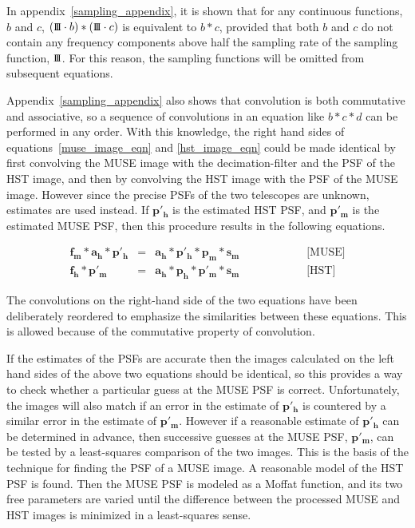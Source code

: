 \documentclass[12pt,twoside,a4paper]{article}
\newcommand{\sha}{\mbox{\small I\!I\!I}}
\newcommand{\msky}{\mathbf{s_m}}
\newcommand{\mpsf}{\mathbf{p_m}}
\newcommand{\hpsf}{\mathbf{p_h}}
\newcommand{\mepsf}{\mathbf{p'_m}}
\newcommand{\hepsf}{\mathbf{p'_h}}
\newcommand{\hlpf}{\mathbf{a_h}}
\newcommand{\mimg}{\mathbf{f_m}}
\newcommand{\himg}{\mathbf{f_h}}
\begin{document}
In appendix~\ref{sampling_appendix}, it is shown that for any
continuous functions, $b$ and $c$, $(\sha \cdot b)\ast (\sha \cdot
c)$ is equivalent to $b \ast c$, provided that both $b$ and $c$ do not
contain any frequency components above half the sampling rate of the
sampling function, $\sha$. For this reason, the sampling functions
will be omitted from subsequent equations.

Appendix~\ref{sampling_appendix} also shows that convolution is both
commutative and associative, so a sequence of convolutions in an
equation like $b \ast c \ast d$ can be performed in any order. With
this knowledge, the right hand sides of equations~\ref{muse_image_eqn}
and \ref{hst_image_eqn} could be made identical by first convolving
the MUSE image with the decimation-filter and the PSF of the HST
image, and then by convolving the HST image with the PSF of the MUSE
image. However since the precise PSFs of the two telescopes are
unknown, estimates are used instead. If $\hepsf$ is the estimated HST
PSF, and $\mepsf$ is the estimated MUSE PSF, then this procedure
results in the following equations.

\begin{eqnarray}
\label{ideal_muse_conv}
\mimg \ast \hlpf \ast \hepsf &=& \hlpf \ast \hepsf \ast \mpsf \ast \msky
\hspace{1in} \mbox{[MUSE]}\\
\label{ideal_hst_conv}
\himg \ast \mepsf &=& \hlpf \ast \hpsf \ast \mepsf \ast \msky
\hspace{1in} \mbox{[HST]}
\end{eqnarray}

The convolutions on the right-hand side of the two equations have
been deliberately reordered to emphasize the similarities between
these equations. This is allowed because of the commutative property
of convolution.

If the estimates of the PSFs are accurate then the images calculated
on the left hand sides of the above two equations should be identical,
so this provides a way to check whether a particular guess at the MUSE
PSF is correct.  Unfortunately, the images will also match if an error
in the estimate of $\hepsf$ is countered by a similar error in the
estimate of $\mepsf$. However if a reasonable estimate of $\hepsf$ can
be determined in advance, then successive guesses at the MUSE PSF,
$\mepsf$, can be tested by a least-squares comparison of the two
images. This is the basis of the technique for finding the PSF of a
MUSE image. A reasonable model of the HST PSF is found. Then the MUSE
PSF is modeled as a Moffat function, and its two free parameters are
varied until the difference between the processed MUSE and HST images
is minimized in a least-squares sense.
\end{document}
